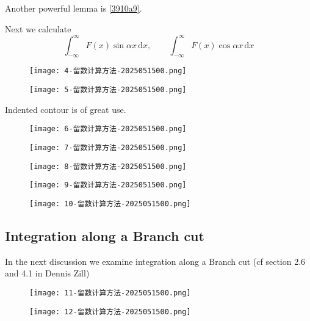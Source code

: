 Another powerful lemma is \cref{3910a9}.

Next we calculate
\[
\int_{-\infty}^{\infty} F(x)\sin\alpha x \, \mathrm{d}x ,\qquad \int_{-\infty}^{\infty} F(x)\cos\alpha x\, \mathrm{d}x 
\]
\begin{figure}[H]
\centering
\texttt{[image: 4-留数计算方法-2025051500.png]}
\label{}
\end{figure}
\begin{figure}[H]
\centering
\texttt{[image: 5-留数计算方法-2025051500.png]}
\label{}
\end{figure}

Indented contour is of great use.

\begin{figure}[H]
\centering
\texttt{[image: 6-留数计算方法-2025051500.png]}
\label{}
\end{figure}

\begin{figure}[H]
\centering
\texttt{[image: 7-留数计算方法-2025051500.png]}
\label{}
\end{figure}

\begin{figure}[H]
\centering
\texttt{[image: 8-留数计算方法-2025051500.png]}
\label{}
\end{figure}

\begin{figure}[H]
\centering
\texttt{[image: 9-留数计算方法-2025051500.png]}
\label{}
\end{figure}
\begin{figure}[H]
\centering
\texttt{[image: 10-留数计算方法-2025051500.png]}
\label{}
\end{figure}

\subsection{Integration along a Branch cut}

In the next discussion we examine integration along a Branch cut (cf section 2.6 and 4.1 in Dennis Zill)

\begin{figure}[H]
\centering
\texttt{[image: 11-留数计算方法-2025051500.png]}
\label{}
\end{figure}
\begin{figure}[H]
\centering
\texttt{[image: 12-留数计算方法-2025051500.png]}
\label{}
\end{figure}

